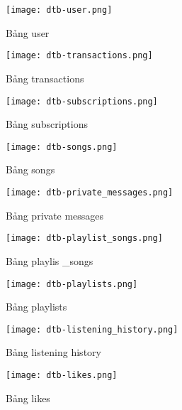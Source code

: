 \documentclass[a4paper]{article}
\begin{document}
\begin{figure}[!htb]
    \centering
    \texttt{[image: dtb-user.png]}
    \caption{Bảng user}
    \label{fig:enter-label}
\end{figure}


\begin{figure}[!htb]
    \centering
    \texttt{[image: dtb-transactions.png]}
    \caption{Bảng transactions}
    \label{fig:enter-label}
\end{figure}

\begin{figure}[!htb]
    \centering
    \texttt{[image: dtb-subscriptions.png]}
    \caption{Bảng subscriptions}
    \label{fig:enter-label}
\end{figure}

\begin{figure}[!htb]
    \centering
    \texttt{[image: dtb-songs.png]}
    \caption{Bảng songs}
    \label{fig:enter-label}
\end{figure}

\begin{figure}[!htb]
    \centering
    \texttt{[image: dtb-private\_messages.png]}
    \caption{Bảng private messages}
    \label{fig:enter-label}
\end{figure}

\begin{figure}[!htb]
    \centering
    \texttt{[image: dtb-playlist\_songs.png]}
    \caption{Bảng playlis _songs}
    \label{fig:enter-label}
\end{figure}

\begin{figure}[!htb]
    \centering
    \texttt{[image: dtb-playlists.png]}
    \caption{Bảng playlists}
    \label{fig:enter-label}
\end{figure}

\begin{figure}[!htb]
    \centering
    \texttt{[image: dtb-listening\_history.png]}
    \caption{Bảng listening history}
    \label{fig:enter-label}
\end{figure}

\begin{figure}[!htb]
    \centering
    \texttt{[image: dtb-likes.png]}
    \caption{Bảng likes}
    \label{fig:enter-label}
\end{figure}
\end{document}
